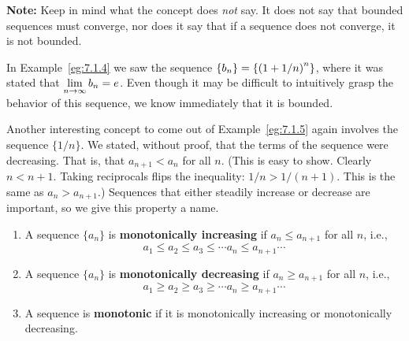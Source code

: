 \textbf{Note:} Keep in mind what the concept does \emph{not} say. It does not say that bounded sequences must converge, nor does it say that if a sequence does not converge, it is not bounded.

In Example~\ref{eg:7.1.4} we saw the sequence $\displaystyle \{b_n\} = \left\{\left(1+1/n\right)^{n}\right\}$, where it was stated that $\displaystyle \lim_{n\to\infty} b_n = e$.  Even though it may be difficult to intuitively grasp the behavior of this sequence, we know immediately that it is bounded.

Another interesting concept to come out of Example~\ref{eg:7.1.5} again involves the sequence $\{1/n\}$. We stated, without proof, that the terms of the sequence were decreasing. That is, that $a_{n+1} < a_n$ for all $n$. (This is easy to show. Clearly $n < n+1$. Taking reciprocals flips the inequality: $1/n > 1/(n+1)$. This is the same as $a_n > a_{n+1}$.) Sequences that either steadily increase or decrease are important, so we give this property a name.

{\begin{enumerate}
\item		A sequence $\{a_n\}$ is \textbf{monotonically increasing} if $a_n \leq a_{n+1}$ for all $n$, i.e.,
 $$a_1 \leq a_2 \leq a_3 \leq \cdots a_n \leq a_{n+1} \cdots$$
 \item	A sequence $\{a_n\}$ is \textbf{monotonically decreasing} if $a_n \geq a_{n+1}$ for all $n$, i.e.,
 $$a_1 \geq a_2 \geq a_3 \geq \cdots a_n \geq a_{n+1} \cdots$$
 \item	A sequence is \textbf{monotonic} if it is monotonically increasing or monotonically decreasing.
 \end{enumerate}
} %


